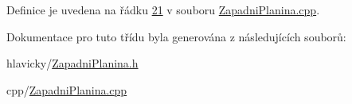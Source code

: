 Definice je uvedena na řádku \hyperlink{ZapadniPlanina_8cpp_source_l00021}{21} v souboru \hyperlink{ZapadniPlanina_8cpp_source}{Zapadni\+Planina.\+cpp}.



Dokumentace pro tuto třídu byla generována z následujících souborů\+:\begin{DoxyCompactItemize}
\item 
hlavicky/\hyperlink{ZapadniPlanina_8h}{Zapadni\+Planina.\+h}\item 
cpp/\hyperlink{ZapadniPlanina_8cpp}{Zapadni\+Planina.\+cpp}\end{DoxyCompactItemize}
